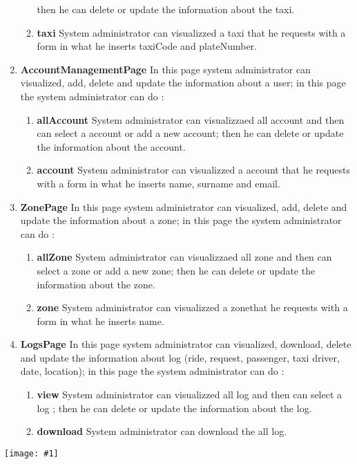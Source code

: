 \documentclass[11pt, a4paper,titlepage]{article}
\newcommand{\image}[1]{
	\begin{center}
		\noindent \texttt{[image: \#1]}
	\end{center}
	}
\begin{document}
\begin{enumerate}
\begin{enumerate}
			then he can delete or update the information about the taxi.
			\item \textbf{taxi} System administrator can visualizzed a taxi that he requests with a form in what he inserts taxiCode and plateNumber.
		\end{enumerate}
		\item \textbf{AccountManagementPage} In this page system administrator can visualized, add, delete and update the information about a user; in this page the system administrator can do :
		\begin{enumerate}
			\item \textbf{allAccount} System administrator can visualizzaed all account and then can select a account or add a new account; then he can delete or update the information about the account.
			\item \textbf{account} System administrator can visualizzed a account that he requests with a form in what he inserts name, surname and email.
		\end{enumerate}
		\item \textbf{ZonePage} In this page system administrator can visualized, add, delete and update the information about a zone; in this page the system administrator can do :
		\begin{enumerate}
			\item \textbf{allZone} System administrator can visualizzaed all zone and then can select a zone or add a new zone; then he can delete or update the information about the zone.
			\item \textbf{zone} System administrator can visualizzed a zonethat he requests with a form in what he inserts name.
		\end{enumerate}
		\item \textbf{LogsPage} In this page system administrator can visualized, download, delete and update the information about log (ride, request, passenger, taxi driver, date, location); in this page the system administrator can do :
		\begin{enumerate}
			\item \textbf{view} System administrator can visualizzed all log and then can select a log ; then he can delete or update the information about the log.
			\item \textbf{download} System administrator can download the all log.
		\end{enumerate}
	\end{enumerate}
	\image{ux_systemadministrator.png}
\end{document}
